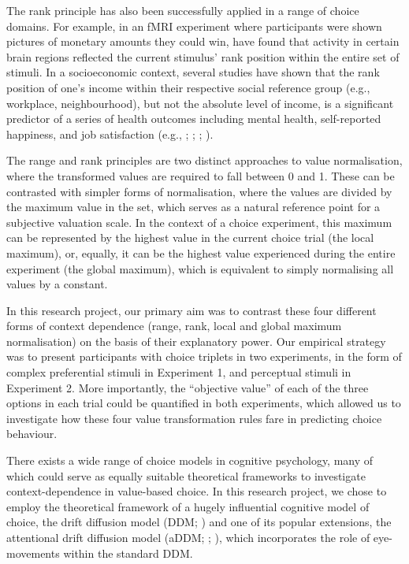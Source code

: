 \documentclass[11pt,a4paper]{article}
\begin{document}

The rank principle has also been successfully applied in a range of choice domains. For example, in an fMRI experiment where participants were shown pictures of monetary amounts they could win,  have found that activity in certain brain regions reflected the current stimulus' rank position within the entire set of stimuli. In a socioeconomic context, several studies have shown that the rank position of one's income within their respective social reference group (e.g., workplace, neighbourhood), but not the absolute level of income, is a significant predictor of a series of health outcomes including mental health, self-reported happiness, and job satisfaction (e.g., ; ; ; ).

The range and rank principles are two distinct approaches to value normalisation, where the transformed values are required to fall between 0 and 1. These can be contrasted with simpler forms of normalisation, where the values are divided by the maximum value in the set, which serves as a natural reference point for a subjective valuation scale. In the context of a choice experiment, this maximum can be represented by the highest value in the current choice trial (the local maximum), or, equally, it can be the highest value experienced during the entire experiment (the global maximum), which is equivalent to simply normalising all values by a constant.

In this research project, our primary aim was to contrast these four different forms of context dependence (range, rank, local and global maximum normalisation) on the basis of their explanatory power. Our empirical strategy was to present participants with choice triplets in two experiments, in the form of complex preferential stimuli in Experiment 1, and perceptual stimuli in Experiment 2. More importantly, the ``objective value''  of each of the three options in each trial could be quantified in both experiments, which allowed us to investigate how these four value transformation rules fare in predicting choice behaviour.

There exists a wide range of choice models in cognitive psychology, many of which could serve as equally suitable theoretical frameworks to investigate context-dependence in value-based choice. In this research project, we chose to employ the theoretical framework of a hugely influential cognitive model of choice, the drift diffusion model (DDM; ) and one of its popular extensions, the attentional drift diffusion model (aDDM; ; ), which incorporates the role of eye-movements within the standard DDM. 
\end{document}
